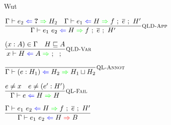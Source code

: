 \documentclass{beamer}
\begin{document}
\begin{frame}{Wut}

\begin{center}
  $\infrule[QLD-App]{\quicklookhinting{e_2}{\Hole}{H_2} \quad \qldeep{\Gamma}{e_1}{H}{f}{\overline{e}}{H'}}{\qldeep{\Gamma}{\app{e_1}{e_2}}{H}{f}{\overline{e}}{H'}}$

  \vspace{2em}

  $\infrule[QLD-Var]{\sidecond{(x : A) \in \Gamma} \quad \sidecond{\hintorder{H}{A}}}{\qldeep{x}{H}{A}{}{}{}}$

  \vspace{2em}

  $\infrule[QL-Annot]{}{\quicklookhinting{\annot{e}{H_1}}{H_2}{\hintlub{H_1}{H_2}}}$

  \vspace{2em}

  $\infrule[QL-Fail]{\sidecond{e \neq x} \quad \sidecond{e \neq \annot{e'}{H'}}}{\quicklookhinting{e}{H}{H}}$

  \vspace{2em}

  $\infrule{\qldeep{\Gamma}{\app{e_1}{e_2}}{H}{f}{\overline{e}}{H'}}{\hinting{\app{e_1}{e_2}}{H}{B}}$
\end{center}

\end{frame}
\end{document}
